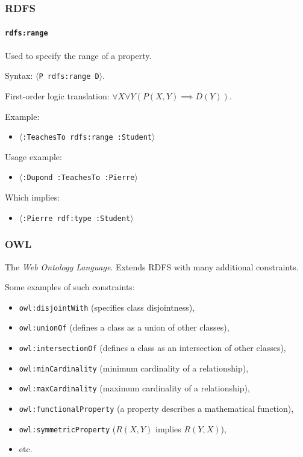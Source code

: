 \documentclass{beamer}
\newcommand{\triple}[1]{$\langle$\texttt{#1}$\rangle$}
\begin{document}
\begin{frame}
  \frametitle{RDFS}
  \framesubtitle{\texttt{rdfs:range}}

  Used to specify the range of a property.

  \pause

  \bigskip

  Syntax: \triple{P rdfs:range D}.

  \pause

  \medskip

  First-order logic translation: $\forall X \forall Y (P(X, Y) \implies D(Y))$.

  \pause

  \bigskip

  Example:

  \begin{itemize}
    \item \triple{:TeachesTo rdfs:range :Student}
  \end{itemize}

  \pause

  Usage example:

  \begin{itemize}
    \item \triple{:Dupond :TeachesTo :Pierre}
  \end{itemize}

  \pause

  Which implies:

  \begin{itemize}
    \item \triple{:Pierre rdf:type :Student}
  \end{itemize}
\end{frame}

\begin{frame}
  \frametitle{OWL}

  The \textit{Web Ontology Language}. Extends RDFS with many additional
  constraints.

  \pause

  \medskip

  Some examples of such constraints:

  \pause

  \begin{itemize}
    \item \texttt{owl:disjointWith} (specifies class disjointness),
    \item \texttt{owl:unionOf} (defines a class as a union of other classes),
    \item \texttt{owl:intersectionOf} (defines a class as an intersection of
      other classes),
    \item \texttt{owl:minCardinality} (minimum cardinality of a relationship),
    \item \texttt{owl:maxCardinality} (maximum cardinality of a relationship),
    \item \texttt{owl:functionalProperty} (a property describes a mathematical function),
    \item \texttt{owl:symmetricProperty} ($R(X, Y)$ implies $R(Y, X)$),
    \item etc.
  \end{itemize}
\end{frame}
\end{document}
